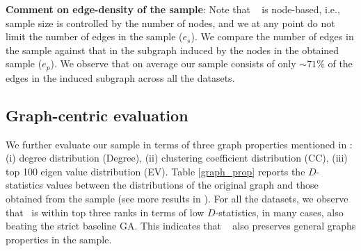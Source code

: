 {\bf Comment on edge-density of the sample}: 
Note that \compas~ is node-based, i.e., sample size is controlled by the number of nodes, and we at any point do not limit the number of edges in the sample ($e_{s}$). We compare the number of edges in the sample against that in the subgraph induced by the nodes in the obtained sample ($e_{p}$). 
We observe that on average our sample consists of only $\sim71$\% of the edges in the induced subgraph across all the datasets. 
\iffalse
\subsection{Graph-centric evaluation}
\label{graph_evaluation}
We further evaluate our sample in terms of three graph properties mentioned in \cite{ahmed2014network}: (i) degree distribution (Degree), (ii) clustering coefficient distribution (CC), (iii) top 100 eigen value distribution (EV). 
Table \ref{graph_prop} reports the $D$-statistics values between the distributions of the original graph and those obtained from the sample (see more results in \cite{si}). For all the datasets, we observe that \compas~is within top three ranks in terms of low $D$-statistics, in many cases, also beating the strict baseline GA. This indicates that \compas~ also preserves general graphs properties in the sample.

